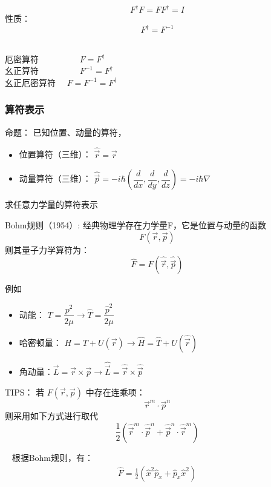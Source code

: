 \begin{frame}
    \emf[幺正(酉)算符] 
        $$ F^{\dagger}F = FF^{\dagger}=I $$
        性质：
        $$ F^{\dagger}=F^{-1}$$ 
          
    \Tips ~\\   
    厄密算符~~~~~~~~~ $ F=F^{\dagger}$  \\
    幺正算符~~~~~~~~~ $ F^{-1}=F^{\dagger}$  \\
    幺正厄密算符~~ $ F=F^{-1}=F^{\dagger}$  \\
\end{frame} 

\begin{frame} 
    \frametitle{算符表示}
    \begin{atcbox}{命题：}
    已知位置、动量的算符，
    \begin{itemize}
        \item  位置算符（三维）： $ \hat{\vec{r}} =\vec{r} $
        \item  动量算符（三维）： $ \hat{\vec{p}} =-i\hbar(\dfrac{d}{d x}, \dfrac{d}{d y} , \dfrac{d}{d z})=-i\hbar \nabla $
    \end{itemize}
    求任意力学量的算符表示
    \end{atcbox}
    \alert{Bohm规则（1954）:} 经典物理学存在力学量F，它是位置与动量的函数
    \[F(\vec{r},\vec{p})\]
    则其量子力学算符为：
    \[\hat{F}=F(\hat{\vec{r}},\hat{\vec{p}})\]
\end{frame} 

\begin{frame}    
    \begin{exampleblock}{例如}
        \begin{itemize}
            \item  动能： $ T=\dfrac{p^2}{2\mu} \to \hat{T}= \dfrac{\hat{p}^2}{2\mu} $
            \item  哈密顿量： $ H=T+U(\vec{r} ) \to \hat{H}= \hat{T}+ U(\hat{\vec{r}})$
            \item  角动量：$ \vec{L}=\vec{r}\times\vec{p} \to \hat{\vec{L}}=\hat{\vec{r}}\times \hat{\vec{p}}$
        \end{itemize}
    \end{exampleblock}  
    \alert{TIPS：} 若 $F(\vec{r},\vec{p})$ 中存在连乘项： 
    \[\vec{r}^m\cdot\vec{p}^n\] 
    则采用如下方式进行取代
    \[\frac{1}{2}(\hat{\vec{r}}^m\cdot\hat{\vec{p}}^n+\hat{\vec{p}}^n\cdot\hat{\vec{r}}^m)\]
\end{frame} 

\begin{frame} 
    \例[6. 求经典物理量$F=x^2p_x$的量子力学算符表示] {} 
    \解~ 根据Bohm规则，有：
    \[\begin{aligned}
        \hat{F}=\frac{1}{2} (\hat{x}^2 \hat{p}_x + \hat{p}_x \hat{x}^2 ) 
    \end{aligned}\]   
\end{frame}     

